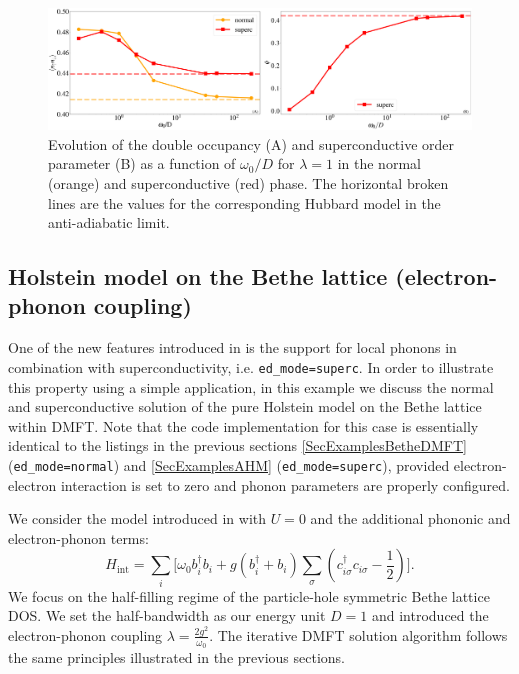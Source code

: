 \documentclass[edipack_sp.tex]{subfiles}
\begin{document}
\begin{figure}[ht!]
    \includegraphics[width=\linewidth]{figures/figBethe_Holstein.pdf}
    \caption{\label{figEx5}
      Evolution of the double occupancy (A) and superconductive order parameter (B) as a function of $\omega_0/D$ for $\lambda=1$ in the normal (orange) and superconductive (red) phase. The horizontal broken lines are the values for the corresponding Hubbard model in the anti-adiabatic limit.}
\end{figure}


\subsection{Holstein model on the Bethe lattice (electron-phonon coupling)}

One of the new features introduced in \NAME is the support for local phonons in combination with superconductivity,
i.e. {\tt ed\_mode=superc}. In order to illustrate this property using a simple application, in this example we discuss the normal and
superconductive solution of the pure Holstein model on the Bethe lattice within DMFT.
Note that the code
implementation for this case is essentially identical to the listings in the previous sections
\ref{SecExamplesBetheDMFT} ({\tt ed\_mode=normal}) and
\ref{SecExamplesAHM} ({\tt ed\_mode=superc}), provided electron-electron interaction is set to zero and phonon parameters are properly configured.  

We consider the model introduced in 
with $U=0$ and the additional phononic and electron-phonon terms:
\begin{equation} \label{eqex:H_Holstein}
    H_\mathrm{int} = \sum_i \Big[\omega_0 b^\dagger_i b_i + g(b^\dagger_i +
    b_i)\sum_{\sigma}\left(c^\dagger_{i\sigma}c_{i\sigma}
    -\frac{1}{2}\right)\Big]. 
\end{equation}
We focus on the half-filling regime of the particle-hole symmetric Bethe lattice DOS. We set the half-bandwidth as our energy unit $D=1$ and introduced the electron-phonon coupling $\lambda = \tfrac{2g^2}{\omega_0}$.  
The iterative DMFT solution algorithm follows the same principles illustrated in the previous sections. 
\end{document}
